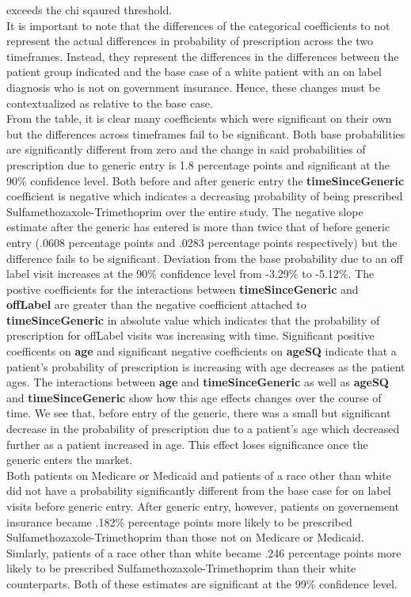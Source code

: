 exceeds the chi sqaured threshold.\\
\indent It is important to note that the differences of the categorical coefficients to not represent the actual differences in probability of prescription across the two timeframes. Instead, they represent the differences in the differences between the patient group indicated and the base case of a white patient with an on label diagnosis who is not on government insurance. Hence, these changes must be contextualized as relative to the base case.\\
\indent From the table, it is clear many coefficients which were significant on their own but the differences across timeframes fail to be significant. Both base probabilities are significantly different from zero and the change in said probabilities of prescription due to generic entry is 1.8 percentage points and significant at the 90\% confidence level. Both before and after generic entry the \textbf{timeSinceGeneric} coefficient is negative which indicates a decreasing probability of being prescribed Sulfamethozaxole-Trimethoprim over the entire study. The negative slope estimate after the generic has entered is more than twice that of before generic entry (.0608 percentage points and .0283 percentage points respectively) but the difference fails to be significant. Deviation from the base probability due to an off label visit increases at the 90\% confidence level from -3.29\% to -5.12\%. The postive coefficients for the interactions between \textbf{timeSinceGeneric} and \textbf{offLabel} are greater than the negative coefficient attached to \textbf{timeSinceGeneric} in absolute value which indicates that the probability of prescription for offLabel visits was increasing with time. Significant positive coefficents on \textbf{age} and significant negative coefficients on \textbf{ageSQ} indicate that a patient's probability of prescription is increasing with age decreases as the patient ages. The interactions between \textbf{age} and \textbf{timeSinceGeneric} as well as \textbf{ageSQ} and \textbf{timeSinceGeneric} show how this age effects changes over the course of time. We see that, before entry of the generic, there was a small but significant decrease in the probability of prescription due to a patient's age which decreased further as a patient increased in age. This effect loses significance once the generic enters the market.\\
\indent Both patients on Medicare or Medicaid and patients of a race other than white did not have a probability significantly different from the base case for on label visits before generic entry. After generic entry, however, patients on governement insurance became .182\% percentage points more likely to be prescribed Sulfamethozaxole-Trimethoprim than those not on Medicare or Medicaid. Simlarly, patients of a race other than white became .246 percentage points more likely to be prescribed Sulfamethozaxole-Trimethoprim than their white counterparts. Both of these estimates are significant at the 99\% confidence level. 


